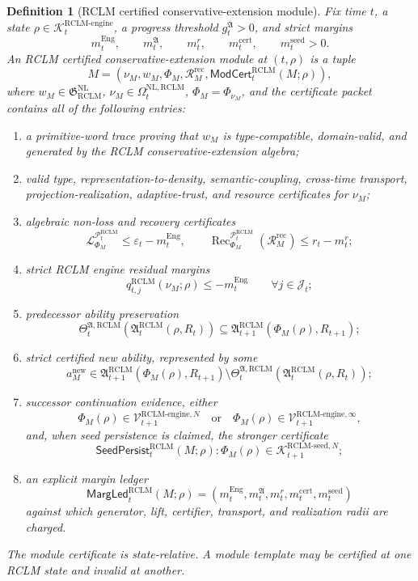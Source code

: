 \documentclass[11pt,a4paper]{article}
\newtheorem{definition}[theorem]{Definition}
\newcommand{\Lcal}{\mathcal L}
\newcommand{\Pcal}{\mathcal P}
\newcommand{\Kcal}{\mathcal K}
\newcommand{\Vcal}{\mathcal V}
\newcommand{\eps}{\varepsilon}
\newcommand{\RCLM}{\mathrm{RCLM}}
\newcommand{\rec}{\mathrm{rec}}
\newcommand{\Rec}{\operatorname{Rec}}
\newcommand{\engine}{\mathrm{engine}}
\newcommand{\NL}{\mathrm{NL}}
\newcommand{\Eng}{\mathrm{Eng}}
\begin{document}
\begin{definition}[RCLM certified conservative-extension module]
\label{def:rclm-batch11-certified-ce-module}
Fix time \(t\), a state \(\rho\in\Kcal_t^{\RCLM\text{-}\engine}\), a progress threshold \(g_t^{\mathfrak A}>0\), and strict margins
\[
m_t^{\Eng},\qquad m_t^{\mathfrak A},\qquad m_t^r,
\qquad m_t^{\mathrm{cert}},\qquad m_t^{\mathrm{seed}}>0.
\]
An RCLM certified conservative-extension module at \((t,\rho)\) is a tuple
\[
M=(\nu_M,w_M,\Phi_M,\mathcal R_M^{\rec},\mathsf{ModCert}_t^{\RCLM}(M;\rho)),
\]
where \(w_M\in\mathfrak G_{\RCLM}^{\NL}\), \(\nu_M\in\Omega_t^{\NL,\RCLM}\), \(\Phi_M=\Phi_{\nu_M}\), and the certificate packet contains all of the following entries:
\begin{enumerate}[label=(\roman*),leftmargin=1.5em]
    \item a primitive-word trace proving that \(w_M\) is type-compatible, domain-valid, and generated by the RCLM conservative-extension algebra;
    \item valid type, representation-to-density, semantic-coupling, cross-time transport, projection-realization, adaptive-trust, and resource certificates for \(\nu_M\);
    \item algebraic non-loss and recovery certificates
    \[
    \Lcal_{\Phi_M}^{\Pcal_t^{\RCLM}}\le \eps_t-m_t^{\Eng},
    \qquad
    \Rec_{\Phi_M}^{\Pcal_t^{\RCLM}}(\mathcal R_M^{\rec})\le r_t-m_t^r;
    \]
    \item strict RCLM engine residual margins
    \[
    q_{t,j}^{\RCLM}(\nu_M;\rho)\le -m_t^{\Eng}
    \qquad\forall j\in\mathcal J_t;
    \]
    \item predecessor ability preservation
    \[
    \Theta_t^{\mathfrak A,\RCLM}(\mathfrak A_t^{\RCLM}(\rho,R_t))
    \subseteq
    \mathfrak A_{t+1}^{\RCLM}(\Phi_M(\rho),R_{t+1});
    \]
    \item strict certified new ability, represented by some
    \[
    a_M^{\mathrm{new}}
    \in
    \mathfrak A_{t+1}^{\RCLM}(\Phi_M(\rho),R_{t+1})
    \setminus
    \Theta_t^{\mathfrak A,\RCLM}(\mathfrak A_t^{\RCLM}(\rho,R_t));
    \]
    \item successor continuation evidence, either
    \[
    \Phi_M(\rho)\in\Vcal_{t+1}^{\RCLM\text{-}\engine,N}
    \quad\text{or}\quad
    \Phi_M(\rho)\in\Vcal_{t+1}^{\RCLM\text{-}\engine,\infty},
    \]
    and, when seed persistence is claimed, the stronger certificate
    \[
    \mathsf{SeedPersist}_t^{\RCLM}(M;\rho):
    \Phi_M(\rho)\in\Kcal_{t+1}^{\RCLM\text{-}\mathrm{seed},N};
    \]
    \item an explicit margin ledger
    \[
    \mathsf{MargLed}_t^{\RCLM}(M;\rho)
    =
    (m_t^{\Eng},m_t^{\mathfrak A},m_t^r,m_t^{\mathrm{cert}},m_t^{\mathrm{seed}})
    \]
    against which generator, lift, certifier, transport, and realization radii are charged.
\end{enumerate}
The module certificate is state-relative.  A module template may be certified at one RCLM state and invalid at another.
\end{definition}
\end{document}
